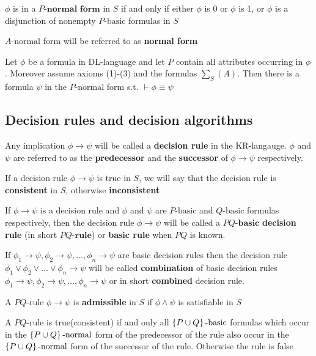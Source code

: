 \documentclass[11pt]{article}
\begin{document}
\(\phi\) is in a \(P\textbf{-normal form}\) in \(S\) if and only if either \(\phi\) is 0 or \(\phi\)
is 1, or \(\phi\) is a disjunction of nonempty \(P\text{-basic}\) formulas in \(S\)

\(A\text{-normal}\) form will be referred to as \textbf{normal form}

\begin{proposition}[7.4]
Let \(\phi\) be a formula in DL-language and let \(P\) contain all attributes
occurring in \(\phi\). Moreover assume axioms (1)-(3) and the formulas \(\sum_S(A)\).
Then there is a formula \(\psi\) in the \(P\text{-normal}\) form s.t. \(\vdash\phi\equiv\psi\)
\end{proposition}
\subsection{Decision rules and decision algorithms}
\label{sec:org7a62621}
Any implication \(\phi\to\psi\) will be called a \textbf{decision rule} in the KR-langauge. \(\phi\)
and \(\psi\) are referred to as the \textbf{predecessor} and the \textbf{successor} of \(\phi\to\psi\)
respectively. 

If a decision rule \(\phi\to\psi\) is true in \(S\), we will say that the decision rule
is \textbf{consistent} in \(S\), otherwise \textbf{inconsistent}

If \(\phi\to\psi\) is a decision rule and \(\phi\) and \(\psi\) are \(P\text{-basic}\) and
\(Q\text{-basic}\) formulas respectively, then the decision rule \(\phi\to\psi\) will
be called a \(PQ\textbf{-basic}\) \textbf{decision rule} (in short \(PQ\textbf{-rule}\))
or \textbf{basic rule} when \(PQ\) is
known.

If \(\phi_1 \to \psi,\phi_2 \to\psi,\dots,\phi_n \to\psi\) are basic decision rules
then the decision rule \(\phi_1 \vee\phi_2 \vee\dots\vee\phi_n \to\psi\) will be
called \textbf{combination} of basic decision rules \(\phi_1 \to \psi,\phi_2
   \to\psi,\dots,\phi_n \to\psi\) or in short  \textbf{combined} decision rule.

A \(PQ\text{-rule}\) \(\phi\to\psi\) is \textbf{admissible} in \(S\) if \(\phi\wedge\psi\) is satisfiable in \(S\)

\begin{proposition}[7.5]
A \(PQ\text{-rule}\) is true(consistent) if and only all \(\left\{ P\cup
   Q\right\}\text{-basic}\) formulas which occur in the 
\(\left\{ P\cup Q\right\}\text{-normal}\)
form of the predecessor of the rule also occur in the 
\(\left\{ P\cup Q\right\}\text{-normal}\) form of the successor of the rule. Otherwise the
rule is false 
\end{proposition}
\end{document}
